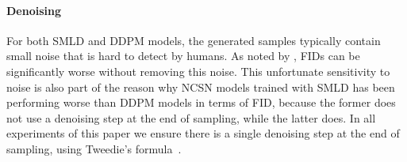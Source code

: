     
\begin{minipage}[t]{0.49\linewidth}
\begin{algorithm}[H]
	\caption{Corrector algorithm (VE SDE).}
	\label{alg:corrector_ve}
	\begin{algorithmic}[1]
            \EndFor
        \EndFor
        \item[]
	\end{algorithmic}
\end{algorithm}
\end{minipage}
\begin{minipage}[t]{0.49\linewidth}
\begin{algorithm}[H]
	\caption{Corrector algorithm (VP SDE).}
	\label{alg:corrector_vp}
	\begin{algorithmic}[1]
            \EndFor
        \EndFor
        \item[]
	\end{algorithmic}
\end{algorithm}
\end{minipage}
\paragraph{Denoising} For both SMLD and DDPM models, the generated samples typically contain small noise that is hard to detect by humans. As noted by \citet{jolicoeur2020adversarial}, FIDs can be significantly worse without removing this noise. This unfortunate sensitivity to noise is also part of the reason why NCSN models trained with SMLD has been performing worse than DDPM models in terms of FID, because the former does not use a denoising step at the end of sampling, while the latter does. In all experiments of this paper we ensure there is a single denoising step at the end of sampling, using Tweedie's formula~\citep{efron2011tweedie}.

